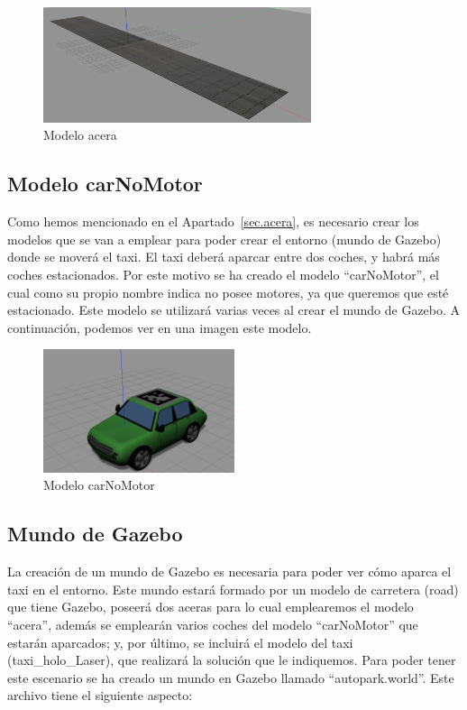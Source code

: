 \begin{figure}[H]
  \begin{center}
    \includegraphics[width=0.7\textwidth]{figures/Autopark/acera.png}
		\caption{Modelo acera}
		\label{fig.acera}
		\end{center}
\end{figure}

\subsection{Modelo carNoMotor}
Como hemos mencionado en el Apartado~\ref{sec.acera}, es necesario crear los modelos que se van a emplear para poder crear el entorno (mundo de Gazebo) donde se moverá el taxi. El taxi deberá aparcar entre dos coches, y habrá más coches estacionados. Por este motivo se ha creado el modelo ``carNoMotor'', el cual como su propio nombre indica no posee motores, ya que queremos que esté estacionado. Este modelo se utilizará varias veces al crear el mundo de Gazebo. A continuación, podemos ver en una imagen este modelo.

\begin{figure}[H]
  \begin{center}
    \includegraphics[width=0.5\textwidth]{figures/Autopark/carNoMotor.png}
		\caption{Modelo carNoMotor}
		\label{fig.carNoMotor}
		\end{center}
\end{figure}

\subsection{Mundo de Gazebo}
La creación de un mundo de Gazebo es necesaria para poder ver cómo aparca el taxi en el entorno. Este mundo estará formado por un modelo de carretera (road) que tiene Gazebo, poseerá dos aceras para lo cual emplearemos el modelo ``acera'', además se emplearán varios coches del modelo ``carNoMotor'' que estarán aparcados; y, por último, se incluirá el modelo del taxi (taxi\_holo\_Laser), que realizará la solución que le indiquemos. Para poder tener este escenario se ha creado un mundo en Gazebo llamado ``autopark.world''. Este archivo tiene el siguiente aspecto:

